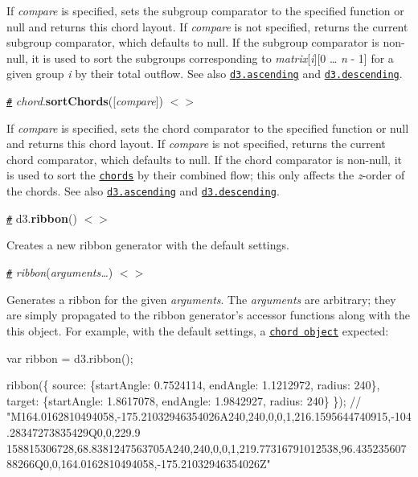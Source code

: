 If {\itshape compare} is specified, sets the subgroup comparator to the specified function or null and returns this chord layout. If {\itshape compare} is not specified, returns the current subgroup comparator, which defaults to null. If the subgroup comparator is non-\/null, it is used to sort the subgroups corresponding to {\itshape matrix}\mbox{[}{\itshape i}\mbox{]}\mbox{[}0 … {\itshape n} -\/ 1\mbox{]} for a given group {\itshape i} by their total outflow. See also \href{https://github.com/d3/d3-array#ascending}{\tt d3.\+ascending} and \href{https://github.com/d3/d3-array#descending}{\tt d3.\+descending}.

\href{#chord_sortChords}{\tt \#} {\itshape chord}.{\bfseries sort\+Chords}(\mbox{[}{\itshape compare}\mbox{]}) \href{https://github.com/d3/d3-chord/blob/master/src/chord.js#L116}{\tt $<$$>$}

If {\itshape compare} is specified, sets the chord comparator to the specified function or null and returns this chord layout. If {\itshape compare} is not specified, returns the current chord comparator, which defaults to null. If the chord comparator is non-\/null, it is used to sort the \href{#_chord}{\tt chords} by their combined flow; this only affects the {\itshape z}-\/order of the chords. See also \href{https://github.com/d3/d3-array#ascending}{\tt d3.\+ascending} and \href{https://github.com/d3/d3-array#descending}{\tt d3.\+descending}.

\href{#ribbon}{\tt \#} d3.{\bfseries ribbon}() \href{https://github.com/d3/d3-chord/blob/master/src/ribbon.js}{\tt $<$$>$}

Creates a new ribbon generator with the default settings.

\href{#_ribbon}{\tt \#} {\itshape ribbon}({\itshape arguments…}) \href{https://github.com/d3/d3-chord/blob/master/src/ribbon.js#L34}{\tt $<$$>$}

Generates a ribbon for the given {\itshape arguments}. The {\itshape arguments} are arbitrary; they are simply propagated to the ribbon generator’s accessor functions along with the {\ttfamily this} object. For example, with the default settings, a \href{#_chord}{\tt chord object} expected\+:


\begin{DoxyCode}
var ribbon = d3.ribbon();

ribbon(\{
  source: \{startAngle: 0.7524114, endAngle: 1.1212972, radius: 240\},
  target: \{startAngle: 1.8617078, endAngle: 1.9842927, radius: 240\}
\}); //
       "M164.0162810494058,-175.21032946354026A240,240,0,0,1,216.1595644740915,-104.28347273835429Q0,0,229.9
      158815306728,68.8381247563705A240,240,0,0,1,219.77316791012538,96.43523560788266Q0,0,164.0162810494058,-175.21032946354026Z"
\end{DoxyCode}


